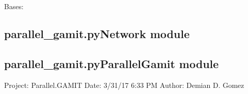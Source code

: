 \documentclass[letterpaper,10pt,english]{sphinxmanual}
\begin{document}

\begin{fulllineitems}
\label{\detokenize{parallel_gamit:parallel_gamit.pyGlobkTask.GlobkException}}
\pysigstartsignatures
{}
\pysigstopsignatures
\sphinxAtStartPar
Bases: 

\end{fulllineitems}



\subsection{parallel\_gamit.pyNetwork module}
\label{\detokenize{parallel_gamit:parallel-gamit-pynetwork-module}}

\subsection{parallel\_gamit.pyParallelGamit module}
\label{\detokenize{parallel_gamit:module-parallel_gamit.pyParallelGamit}}\label{\detokenize{parallel_gamit:parallel-gamit-pyparallelgamit-module}}
\sphinxAtStartPar
Project: Parallel.GAMIT
Date: 3/31/17 6:33 PM
Author: Demian D. Gomez
\end{document}
